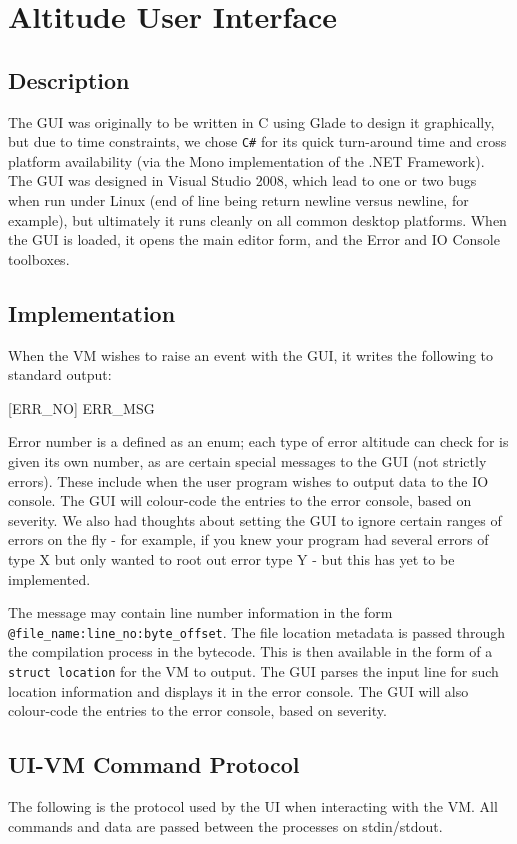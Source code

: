 \documentclass[10pt,a4paper]{report}
\begin{document}
\section{Altitude User Interface}

\subsection{Description}
The GUI was originally to be written in C using Glade to design it graphically, but due to time constraints, we chose \lstinline{C#} for its quick turn-around time and cross platform availability (via the Mono implementation of the .NET Framework). The GUI was designed in Visual Studio 2008, which lead to one or two bugs when run under Linux (end of line being return newline versus newline, for example), but ultimately it runs cleanly on all common desktop platforms. When the GUI is loaded, it opens the main editor form, and the Error and IO Console toolboxes.

\subsection{Implementation}
When the VM wishes to raise an event with the GUI, it writes the following to standard output:

[ERR\_NO] ERR\_MSG

Error number is a defined as an enum; each type of error altitude can check for is given its own number, as are certain special messages to the GUI (not strictly errors). These include when the user program wishes to output data to the IO console. The GUI will colour-code the entries to the error console, based on severity. We also had thoughts about setting the GUI to ignore certain ranges of errors on the fly -  for example, if you knew your program had several errors of type X but only wanted to root out error type Y - but this has yet to be implemented.

The message may contain line number information in the form \lstinline{@file_name:line_no:byte_offset}. The file location metadata is passed through the compilation process in the bytecode. This is then available in the form of a \lstinline{struct location} for the VM to output. The GUI parses the input line for such location information and displays it in the error console. The GUI will also colour-code the entries to the error console, based on severity.

\subsection{UI-VM Command Protocol}
The following is the protocol used by the UI when interacting with the VM. All commands and data are passed between the processes on stdin/stdout.
\end{document}
